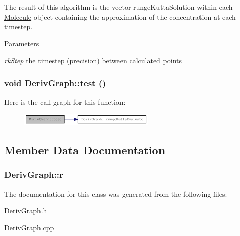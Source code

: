 The result of this algorithm is the vector rungeKuttaSolution within each \hyperlink{classMolecule}{Molecule} object containing the approximation of the concentration at each timestep.


\begin{DoxyParams}{Parameters}
\item[{\em rkStep}]the timestep (precision) between calculated points \end{DoxyParams}
\hypertarget{classDerivGraph_abf589f6aabe2c66bbe6f1aeb68ff4593}{
\subsubsection[{test}]{\setlength{\rightskip}{0pt plus 5cm}void DerivGraph::test ()}}
\label{classDerivGraph_abf589f6aabe2c66bbe6f1aeb68ff4593}


Here is the call graph for this function:\nopagebreak
\begin{figure}[H]
\begin{center}
\leavevmode
\includegraphics[width=183pt]{classDerivGraph_abf589f6aabe2c66bbe6f1aeb68ff4593_cgraph}
\end{center}
\end{figure}


\subsection{Member Data Documentation}
\hypertarget{classDerivGraph_a2d5931b4ca8a9c6e0c013a74a5cfbc7c}{
\subsubsection[{r}]{ {\bf DerivGraph::r}}}
\label{classDerivGraph_a2d5931b4ca8a9c6e0c013a74a5cfbc7c}


The documentation for this class was generated from the following files:\begin{DoxyCompactItemize}
\item 
\hyperlink{DerivGraph_8h}{DerivGraph.h}\item 
\hyperlink{DerivGraph_8cpp}{DerivGraph.cpp}\end{DoxyCompactItemize}
